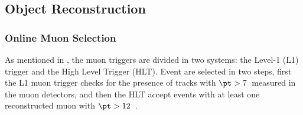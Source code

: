 \subsection{Object Reconstruction} \label{sec:WBoson_Analysis_ObjectReconstruction}


\subsubsection{Online Muon Selection} \label{sec:WBoson_Analysis_MuonTrigger}

As mentioned in , the muon triggers are divided in two systems: the Level-1 (L1) trigger and the High Level Trigger (HLT). Event are selected in two steps, first the L1 muon trigger checks for the presence of tracks with $\pt > 7$~\GeVc measured in the muon detectors, and then the HLT accept events with at least one reconstructed muon with $\pt > 12$~\GeVc.




